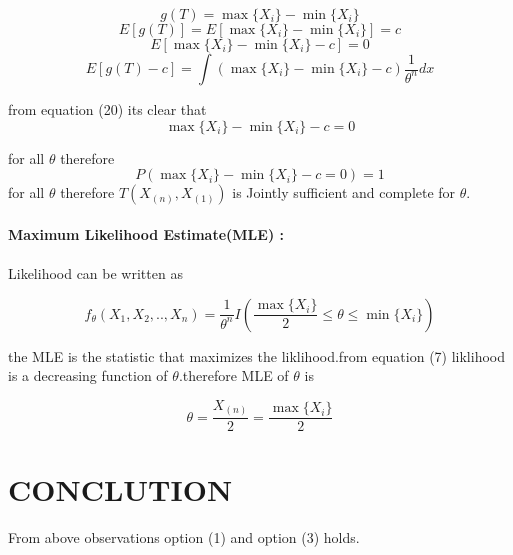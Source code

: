 \documentclass[journal,12pt,twocolumn]{IEEEtran}
\begin{document}
\begin{equation}
     g(T)=\max\{X_i\}-\min\{X_i\}
\end{equation}
\begin{equation}
     E[g(T)]=E[\max\{X_i\}-\min\{X_i\}]=c
\end{equation}
\begin{equation}
    E[\max\{X_i\}-\min\{X_i\}-c]=0
\end{equation}
\begin{equation}
    E[g(T)-c]=\int(\max\{X_i\}-\min\{X_i\}-c)\frac{1}{\theta^n}dx
\end{equation}

from equation (20) its clear that
\begin{equation}
    \max\{X_i\}-\min\{X_i\}-c=0
\end{equation}

for all $\theta$ therefore 
\begin{equation}
    P(\max\{X_i\}-\min\{X_i\}-c=0)=1 
\end{equation}
for all $\theta$
therefore $T(X_{(n)},X_{(1)})$ is Jointly sufficient and complete for $\theta$. \\ \\
\textbf{Maximum Likelihood Estimate(MLE) :}\\ \\
Likelihood can be written as 

\begin{equation}
    f_\theta(X_1,X_2,..,X_n)=\frac{1}{\theta^n}I\left( \frac{\max     \{X_i\}}{2}\leq\theta\leq \min\{X_i\}\right)
\end{equation}

the MLE is the statistic that maximizes the liklihood.from equation (7) liklihood is a decreasing function of $\theta$.therefore MLE of $\theta$ is 

\begin{equation}
    \theta=\frac{X_{(n)}}{2}=\frac{\max\{X_i\}}{2}
\end{equation}

\section{\textbf{CONCLUTION}}
From above observations option (1) and option (3) holds.
\end{document}
